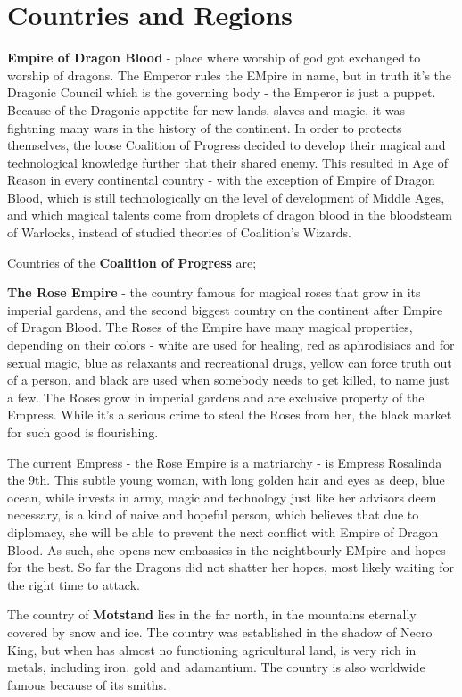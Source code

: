 \documentclass[a4paper,11pt]{article}
\begin{document}
\section{Countries and Regions}

\textbf{Empire of Dragon Blood} - place where worship of god got exchanged to worship of dragons. The Emperor rules the EMpire in name, but in truth it's the Dragonic Council which is the governing body - the Emperor is just a puppet. Because of the Dragonic appetite for new lands, slaves and magic, it was fightning many wars in the history of the continent. In order to protects themselves, the loose Coalition of Progress decided to develop their magical and technological knowledge further that their shared enemy. This resulted in Age of Reason in every continental country - with the exception of Empire of Dragon Blood, which is still technologically on the level of development of Middle Ages, and which magical talents come from droplets of dragon blood in the bloodsteam of Warlocks, instead of studied theories of Coalition's Wizards.  

Countries of the \textbf{Coalition of Progress} are;

\textbf{The Rose Empire} - the country famous for magical roses that grow in its imperial gardens, and the second biggest country on the continent after Empire of Dragon Blood. The Roses of the Empire have many magical properties, depending on their colors - white are used for healing, red as aphrodisiacs and for sexual magic, blue as relaxants and recreational drugs, yellow can force truth out of a person, and black are used when somebody needs to get killed, to name just a few. The Roses grow in imperial gardens and are exclusive property of the Empress. While it's a serious crime to steal the Roses from her, the black market for such good is flourishing. 

The current Empress - the Rose Empire is a matriarchy - is Empress Rosalinda the 9th. This subtle young woman, with long golden hair and eyes as deep, blue ocean, while invests in army, magic and technology just like her advisors deem necessary, is a kind of naive and hopeful person, which believes that due to diplomacy, she will be able to prevent the next conflict with Empire of Dragon Blood. As such, she opens new embassies in the neightbourly EMpire and hopes for the best. So far the Dragons did not shatter her hopes, most likely waiting for the right time to attack.

The country of \textbf{Motstand} lies in the far north, in the mountains eternally covered by snow and ice. The country was established in the shadow of Necro King, but when has almost no functioning agricultural land, is very rich in metals, including iron, gold and adamantium. The country is also worldwide famous because of its smiths.
\end{document}
